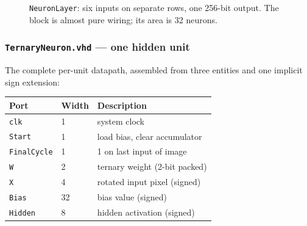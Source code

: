 \documentclass[11pt,a4paper]{article}
\begin{document}
\begin{figure}[H]
\centering
{}
\caption{\texttt{NeuronLayer}: six inputs on separate rows, one 256-bit output.
  The block is almost pure wiring; its area is 32 neurons.}
\label{fig:neuronlayer}
\end{figure}

\subsubsection{\texttt{TernaryNeuron.vhd} --- one hidden unit}
\label{sub:neuron}

The complete per-unit datapath, assembled from three entities and one implicit
sign extension:

\begin{center}
\small
\begin{tabularx}{\linewidth}{@{}llL@{}}
\toprule
\textbf{Port} & \textbf{Width} & \textbf{Description} \\
\midrule
\texttt{clk}        & 1  & system clock \\
\texttt{Start}      & 1  & load bias, clear accumulator \\
\texttt{FinalCycle} & 1  & 1 on last input of image \\
\texttt{W}          & 2  & ternary weight (2-bit packed) \\
\texttt{X}          & 4  & rotated input pixel (signed) \\
\texttt{Bias}       & 32 & bias value (signed) \\
\texttt{Hidden}     & 8  & hidden activation (signed) \\
\bottomrule
\end{tabularx}
\end{center}
\end{document}
